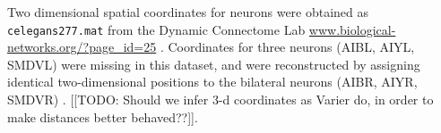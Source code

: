 \documentclass[10pt,letterpaper]{article}
\begin{document}
Two dimensional spatial coordinates for neurons were obtained as \texttt{celegans277.mat} from the Dynamic Connectome Lab \url{www.biological-networks.org/?page_id=25} \cite{choe2004}.
Coordinates for three neurons (AIBL, AIYL, SMDVL) were missing in this dataset, and were reconstructed by assigning identical two-dimensional positions to the bilateral neurons (AIBR, AIYR, SMDVR) \cite{Varier2011}.
[[TODO: Should we infer 3-d coordinates as Varier do, in order to make distances better behaved??]].

\end{document}
